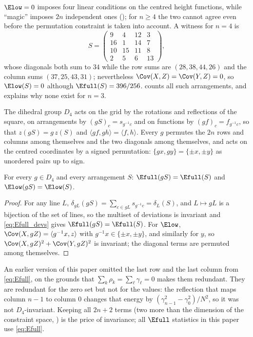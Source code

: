 \begin{remark}
\label{rem:four_term_insufficient}
$\Elow=0$ imposes four linear conditions on the centred height functions, while ``magic'' imposes $2n$ independent ones
(); for $n\ge4$ the two cannot agree even before the permutation constraint is taken into account.
A witness for $n=4$ is
\[
S=\begin{pmatrix}9&4&12&3\\16&1&14&7\\10&15&11&8\\2&5&6&13\end{pmatrix},
\]
whose diagonals both sum to $34$ while the row sums are $(28,38,44,26)$ and the column sums $(37,25,43,31)$; nevertheless $\Cov(X,Z)=\Cov(Y,Z)=0$, so $\Elow(S)=0$ although $\Efull(S)=396/256$.
 counts all such arrangements, and  explains why none exist for $n=3$.
\end{remark}

The dihedral group $D_4$ acts on the grid by the rotations and reflections of the square, on arrangements by
$(gS)_c=s_{g^{-1}c}$ and on functions by $(gf)_c=f_{g^{-1}c}$, so that $z(gS)=g\,z(S)$ and $\langle gf,gh\rangle=\langle f,h\rangle$.
Every $g$ permutes the $2n$ rows and columns among themselves and the two diagonals among themselves, and acts on the centred
coordinates by a signed permutation: $\{gx,gy\}=\{\pm x,\pm y\}$ as unordered pairs up to sign.

\begin{proposition}
\label{prop:d4_energy}
For every $g\in D_4$ and every arrangement $S$: $\Efull(gS)=\Efull(S)$ and
$\Elow(gS)=\Elow(S)$.
\end{proposition}

\begin{proof}
For any line $L$, $\delta_{gL}(gS)=\sum_{c\in gL}s_{g^{-1}c}=\delta_L(S)$, and $L\mapsto gL$ is a bijection of the set of lines,
so the multiset of deviations is invariant and \eqref{eq:Efull_devs} gives $\Efull(gS)=\Efull(S)$.  For $\Elow$,
$\Cov(X,gZ)=\langle g^{-1}x,z\rangle$ with $g^{-1}x\in\{\pm x,\pm y\}$, and similarly for $y$, so
$\Cov(X,gZ)^{2}+\Cov(Y,gZ)^{2}$ is invariant; the diagonal terms are permuted among themselves.
\end{proof}

An earlier version of this paper omitted the last row and the last column from \eqref{eq:Efull}, on the grounds that
$\sum_k\rho_k=\sum_\ell\gamma_\ell=0$ makes them redundant.  They are redundant for the zero set but not for the values:
the reflection that maps column $n-1$ to column $0$ changes that energy by $(\gamma_{n-1}^{2}-\gamma_{0}^{2})/N^{2}$, so it was not
$D_4$-invariant.  Keeping all $2n+2$ terms (two more than the dimension of the constraint space, ) is the price of
invariance; all $\Efull$ statistics in this paper use \eqref{eq:Efull}.

